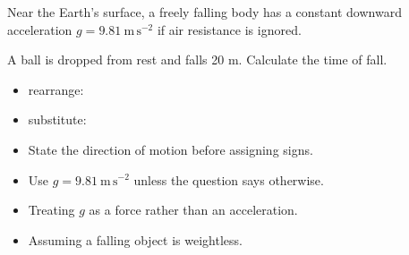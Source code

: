 \documentclass[11pt,a4paper]{article}
\begin{document}



Near the Earth's surface, a freely falling body has a constant downward
acceleration $g = 9.81\ \mathrm{m\,s^{-2}}$ if air resistance is ignored.


A ball is dropped from rest and falls 20 m. Calculate the time of fall.
\begin{itemize}
  \item rearrange: 
  \item substitute: 
\end{itemize}

\begin{jtexamfocus}
\begin{itemize}[leftmargin=1.05em,itemsep=1pt,topsep=1pt,parsep=0pt]
  \item State the direction of motion before assigning signs.
  \item Use $g = 9.81\ \mathrm{m\,s^{-2}}$ unless the question says otherwise.
\end{itemize}
\end{jtexamfocus}

\begin{jtmisconception}
\begin{itemize}[leftmargin=1.05em,itemsep=1pt,topsep=1pt,parsep=0pt]
  \item Treating $g$ as a force rather than an acceleration.
  \item Assuming a falling object is weightless.
\end{itemize}
\end{jtmisconception}


\end{document}
